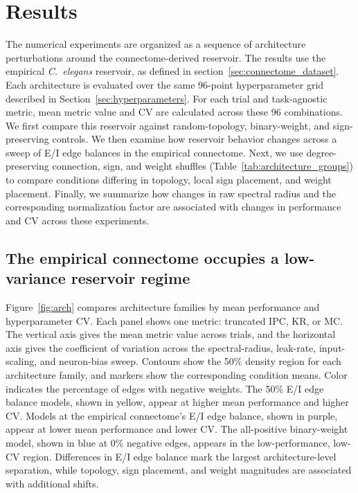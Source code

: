 \documentclass[a4paper,fleqn]{style_neural_networks/cas-dc}
\begin{document}
\section{Results}
\label{sec:results}
The numerical experiments are organized as a sequence of architecture perturbations around the connectome-derived reservoir. The results use the empirical \textit{C.\ elegans} reservoir, as defined in section~\ref{sec:connectome_dataset}. Each architecture is evaluated over the same 96-point hyperparameter grid described in Section~\ref{sec:hyperparameters}. For each trial and task-agnostic metric, mean metric value and CV are calculated across these 96 combinations. We first compare this reservoir against random-topology, binary-weight, and sign-preserving controls. We then examine how reservoir behavior changes across a sweep of E/I edge balances in the empirical connectome. Next, we use degree-preserving connection, sign, and weight shuffles (Table~\ref{tab:architecture_groups}) to compare conditions differing in topology, local sign placement, and weight placement. Finally, we summarize how changes in raw spectral radius and the corresponding normalization factor are associated with changes in performance and CV across these experiments.

\subsection{The empirical connectome occupies a low-variance reservoir regime}
Figure~\ref{fig:arch} compares architecture families by mean performance and hyperparameter CV. Each panel shows one metric: truncated IPC, KR, or MC. The vertical axis gives the mean metric value across trials, and the horizontal axis gives the coefficient of variation across the spectral-radius, leak-rate, input-scaling, and neuron-bias sweep. Contours show the 50\% density region for each architecture family, and markers show the corresponding condition means. Color indicates the percentage of edges with negative weights. The 50\% E/I edge balance models, shown in yellow, appear at higher mean performance and higher CV. Models at the empirical connectome's E/I edge balance, shown in purple, appear at lower mean performance and lower CV. The all-positive binary-weight model, shown in blue at 0\% negative edges, appears in the low-performance, low-CV region. Differences in E/I edge balance mark the largest architecture-level separation, while topology, sign placement, and weight magnitudes are associated with additional shifts.
\end{document}
